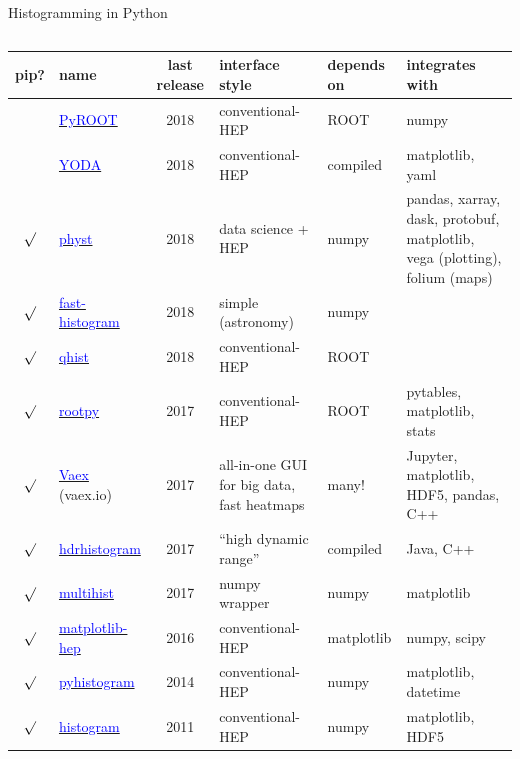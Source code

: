 \documentclass[aspectratio=169]{beamer}
\begin{document}
\begin{frame}{Histogramming in Python}
\scriptsize
\vspace{0.25 cm}
\begin{columns}
\renewcommand{\arraystretch}{1.2}
\begin{tabular}{c l c p{2.7 cm} p{1.5 cm} p{4.75 cm}}
pip? & name & last release & interface style & depends on & integrates with \\\hline
& \href{https://root.cern.ch/pyroot}{\textcolor{blue}{PyROOT}} & 2018 & conventional-HEP & ROOT & numpy \\
& \href{https://yoda.hepforge.org/pydoc}{\textcolor{blue}{YODA}} & 2018 & conventional-HEP & compiled & matplotlib, yaml \\
$\surd$ & \href{https://pypi.python.org/pypi/physt}{\textcolor{blue}{physt}} & 2018 & data science + HEP & numpy & pandas, xarray, dask, protobuf, matplotlib, vega (plotting), folium (maps) \\
$\surd$ & \href{https://pypi.org/project/fast-histogram}{\textcolor{blue}{fast-histogram}} & 2018 & simple (astronomy) & numpy & \\
$\surd$ & \href{https://pypi.org/project/qhist/}{\textcolor{blue}{qhist}} & 2018 & conventional-HEP & ROOT & \\
$\surd$ & \href{https://pypi.org/project/rootpy}{\textcolor{blue}{rootpy}} & 2017 & conventional-HEP & ROOT & pytables, matplotlib, stats \\
$\surd$ & \href{https://vaex.io}{\textcolor{blue}{Vaex}} (vaex.io) & 2017 & all-in-one GUI for big data, fast heatmaps & many! & Jupyter, matplotlib, HDF5, pandas, C++ \\
$\surd$ & \href{https://pypi.python.org/pypi/hdrhistogram}{\textcolor{blue}{hdrhistogram}} & 2017 & ``high dynamic range'' & compiled & Java, C++ \\
$\surd$ & \href{https://pypi.python.org/pypi/multihist}{\textcolor{blue}{multihist}} & 2017 & numpy wrapper & numpy & matplotlib \\
$\surd$ & \href{https://github.com/ibab/matplotlib-hep}{\textcolor{blue}{matplotlib-hep}} & 2016 & conventional-HEP & matplotlib & numpy, scipy \\
$\surd$ & \href{https://pypi.python.org/pypi/pyhistogram}{\textcolor{blue}{pyhistogram}} & 2014 & conventional-HEP & numpy & matplotlib, datetime \\
$\surd$ & \href{https://pypi.python.org/pypi/histogram}{\textcolor{blue}{histogram}} & 2011 & conventional-HEP & numpy & matplotlib, HDF5 \\

\end{tabular}
\end{columns}
\end{frame}
\end{document}
